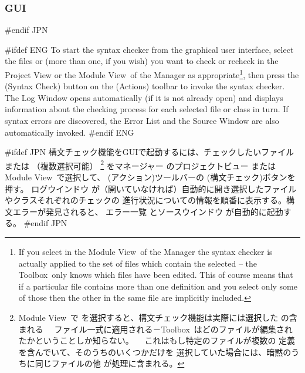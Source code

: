 \documentclass[\pformat,12pt]{article}
\newcommand{\Toolbox}{Toolbox}
\newcommand{\vdmModView}{\guicmd{Module View}}
\newcommand{\vdmModView}{\guicmd{モジュールビュー}}
\newcommand{\Toolbox}{Toolbox}
\newcommand{\vdmModView}{\guicmd{VDM View}}
\newcommand{\vdmModView}{\guicmd{VDMビュー}}
\newcommand{\guicmd}[1]{{\sf #1}}
\newcommand{\guicmd}[1]{{\gt #1}}
\begin{document}
\subsubsection{GUI}
#endif JPN

#ifdef ENG
To start the syntax checker from the graphical user interface, select 
the files or  (more than
one, if you wish) you want to check or recheck in the \guicmd{Project
  View} or the \vdmModView\ of the \guicmd{Manager} as
appropriate\footnote{If you select 
   in the 
  \vdmModView\ of the \guicmd{Manager} the syntax checker is
  actually applied to the set of files which contain the selected
   -- the \Toolbox\ only
  knows which files have been edited. This of course means
  that if a particular file contains more than one
   definition and you 
  select only some of those 
  then the other  in the
  same file are implicitly included.}, then press the
(\guicmd{Syntax Check})
button on the (\guicmd{Actions})
toolbar to invoke the syntax checker. The \guicmd{Log Window} opens
automatically (if it is not already open) and displays information
about the checking process for each selected file or class in turn. If
syntax errors are discovered, the \guicmd{Error 
List} and the \guicmd{Source Window} are also 
au\-to\-matically invoked. 
#endif ENG

#ifdef JPN
構文チェック機能をGUIで起動するには、チェックしたいファイルまたは
 （複数選択可能）
\footnote{
  \vdmModView\ で
   を選択すると、構文チェック機能は実際には選択した
   の含まれる
　ファイル一式に適用される－\Toolbox\ はどのファイルが編集されたかということしか知らない。
　これはもし特定のファイルが複数の
   定義を含んでいて、そのうちのいくつかだけを
  選択していた場合には、暗黙のうちに同じファイルの他
   が処理に含まれる。
}
を\guicmd{マネージャー} の\guicmd{プロジェクトビュー} または\vdmModView\ で選択して、
(\guicmd{アクション})ツールバーの   
(\guicmd{構文チェック})ボタンを押す。
\guicmd{ログウインドウ} が（開いていなければ）自動的に開き選択したファイルやクラスそれぞれのチェックの
進行状況についての情報を順番に表示する。構文エラーが発見されると、
\guicmd{エラー一覧} と\guicmd{ソースウインドウ} が自動的に起動する。
#endif JPN
\end{document}
